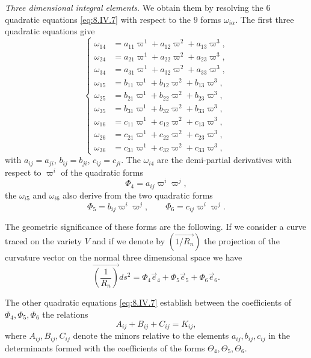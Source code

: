 \documentclass[leqno,11pt]{book}
\numberwithin{equation}{chapter}
\theoremstyle{shape1}
\theoremstyle{shape0}
\theoremstyle{shape2}
\theoremstyle{definition}
\begin{document}
\vspace{12pt}\fsec \emph{Three dimensional integral elements}. We obtain them by resolving the $6$ quadratic equations \eqref{eq:8.IV.7} with respect to the $9$ forms $\omega_{i\alpha}$. The first three quadratic equations give
\begin{equation}
  \label{eq:8.IV.8}\tag{IV, 8}
  \left\{
    \begin{aligned}
      \omega_{14}&=a_{11}\varpi^{1}+a_{12}\varpi^{2}+a_{13}\varpi^{3},\\
      \omega_{24}&=a_{21}\varpi^{1}+a_{22}\varpi^{2}+a_{23}\varpi^{3},\\
      \omega_{34}&=a_{31}\varpi^{1}+a_{32}\varpi^{2}+a_{33}\varpi^{3},\\
      \omega_{15}&=b_{11}\varpi^{1}+b_{12}\varpi^{2}+b_{13}\varpi^{3},\\
      \omega_{25}&=b_{21}\varpi^{1}+b_{22}\varpi^{2}+b_{23}\varpi^{3},\\
      \omega_{35}&=b_{31}\varpi^{1}+b_{32}\varpi^{2}+b_{33}\varpi^{3},\\
      \omega_{16}&=c_{11}\varpi^{1}+c_{12}\varpi^{2}+c_{13}\varpi^{3},\\
      \omega_{26}&=c_{21}\varpi^{1}+c_{22}\varpi^{2}+c_{23}\varpi^{3},\\
      \omega_{36}&=c_{31}\varpi^{1}+c_{32}\varpi^{2}+c_{33}\varpi^{3},
    \end{aligned}
  \right.
\end{equation}
with $a_{ij}=a_{ji}$, $b_{ij}=b_{ji}$, $c_{ij}=c_{ji}$. The $\omega_{i4}$ are the demi-partial derivatives with respect to $\varpi^{i}$ of the quadratic forms
\[
\Phi_{4}=a_{ij}\varpi^{i}\varpi^{j},
\]
the $\omega_{i5}$ and $\omega_{i6}$ also derive from the two quadratic forms
\[
\Phi_{5}=b_{ij}\varpi^{i}\varpi^{j},\qquad\Phi_{6}=c_{ij}\varpi^{i}\varpi^{j}.
\]

The geometric significance of these forms are the following. If we consider a curve traced on the variety $V$ and if we denote by $(\overrightarrow{1/R_{n}})$ the projection of the curvature vector on the normal three dimensional space we have
\[
\overrightarrow{\left(\frac{1}{R_{n}}\right)}ds^{2}=\Phi_{4}\vec e_{4}+\Phi_{5}\vec e_{5}+\Phi_{6}\vec e_{6}.
\]

The other quadratic equations \eqref{eq:8.IV.7} establish between the coefficients of $\Phi_{4},\Phi_{5},\Phi_{6}$ the relations
\begin{equation}
  \label{eq:8.IV.9}\tag{IV, 9}
  A_{ij}+B_{ij}+C_{ij}=K_{ij},
\end{equation}
where $A_{ij},B_{ij},C_{ij}$ denote the minors relative to the elements $a_{ij},b_{ij},c_{ij}$ in the determinants formed with the coefficients of the forms $\Theta_{4},\Theta_{5},\Theta_{6}$.
\end{document}

